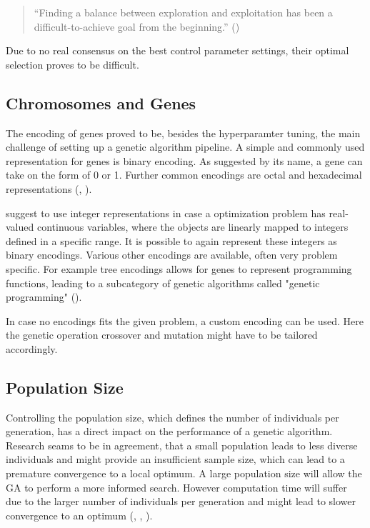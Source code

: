 \begin{quote}
	\begin{em}
		\enquote{Finding a balance between exploration and exploitation has been a difficult-to-achieve goal from the beginning.} (\cite{kacprzyk_parameter_2007})
	\end{em}
\end{quote}

Due to no real consensus on the best control parameter settings, their optimal selection proves to be difficult.

\subsection{Chromosomes and Genes}
\label{chap:foundation:ga:encoding}


The encoding of genes proved to be, besides the hyperparamter tuning, the main challenge of setting up a genetic algorithm pipeline.
A simple and commonly used representation for genes is binary encoding. As suggested by its name, a gene can take on the form of 0 or 1. Further common encodings are octal and hexadecimal representations (\cite{srinivas_genetic_1994}, \cite{katoch_review_2021}).

\cite{srinivas_genetic_1994} suggest to use integer representations in case a optimization problem has real-valued continuous variables, where the objects are linearly mapped to integers defined in a specific range. It is possible to again represent these integers as binary encodings. Various other encodings are available, often very problem specific. For example tree encodings allows for genes to represent programming functions, leading to a subcategory of genetic algorithms called "genetic programming" (\cite{katoch_review_2021}).

In case no encodings fits the given problem, a custom encoding can be used. Here the genetic operation crossover and mutation might have to be tailored accordingly. 


\subsection{Population Size}
Controlling the population size, which defines the number of individuals per generation, has a direct impact on the performance of a genetic algorithm.
Research seams to be in agreement, that a small population leads to less diverse individuals and might provide an insufficient sample size, which can lead to a premature convergence to a local optimum.
A large population size will allow the GA to perform a more informed search. However computation time will suffer due to the larger number of individuals per generation and might lead to slower convergence to an optimum (\cite{grefenstette_optimization_1986}, \cite{katoch_review_2021}, \cite{kacprzyk_parameter_2007}).

